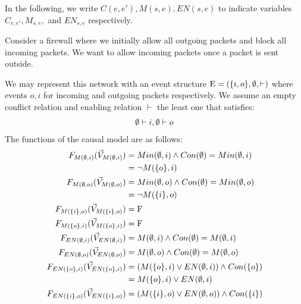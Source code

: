 In the following, we write $C(e,e'),M(s,e),EN(s,e)$ to indicate variables
$C_{e,e'},M_{s,e},$ and $EN_{s,e}$ respectively.
\begin{example}
    Consider a firewall where we initially allow all outgoing packets and block all incoming packets.
    We want to allow incoming packets once a packet is sent outside.
    \begin{center}
    \end{center}
    We may represent this network with an event structure 
    $\mathrm{E} = (\{i,o\},\emptyset,\vdash)$ where events $o,i$ for incoming 
    and outgoing packets respectively.
    We assume an empty conflict relation and enabling relation
    $\vdash$ the least one that satisfies:
    \begin{align*}
        \emptyset \vdash i, \emptyset \vdash o
    \end{align*}
    The functions of the causal model are as follows:
    \begin{align*}
        \f{M(\e,i)}     & = Min(\e,i) \wedge Con(\e) = Min(\e,i)   \\
                        & = \neg M(\s{o},i)                        \\
        \f{M(\e,o)}     & = Min(\e,o) \wedge Con(\e) =  Min(\e,o)  \\
                        & = \neg M(\s{i},o)                        \\
        \f{M(\s{i},o)}  & = \F                                     \\
        \f{M(\s{o},i)}  & = \F                                     \\
        \f{EN(\e,i)}    & = M(\e,i) \wedge Con(\e) = M(\e,i)       \\
        \f{EN(\e,o)}    & = M(\e,o) \wedge Con(\e) = M(\e,o)       \\
        \f{EN(\s{o},i)} & =
        \left( M(\s{o},i) \vee EN(\e,i)  \right) \wedge Con(\s{o}) \\
                        & = M(\s{o},i) \vee EN(\e,i)               \\
        \f{EN(\s{i},o)} & =
        \left( M(\s{i},o) \vee EN(\e,o) \right)
        \wedge Con(\s{i})                                          \\

\end{align*}
\end{example}
